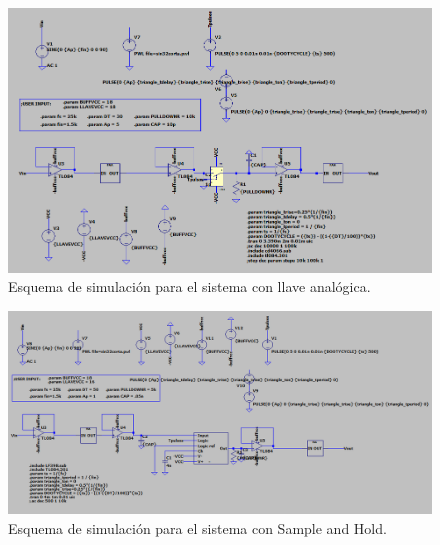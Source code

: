 \begin{figure}[H]
\centering
\includegraphics[width=\textwidth]{ImagenesEjercicio6/SIMULACIONLLAVE.png}
\caption{Esquema de simulación para el sistema con llave analógica.}
\end{figure}

\begin{figure}[H]
\centering
\includegraphics[width=\textwidth]{ImagenesEjercicio6/SIMULACIONSH.png}
\caption{Esquema de simulación para el sistema con Sample and Hold.}
\end{figure}


